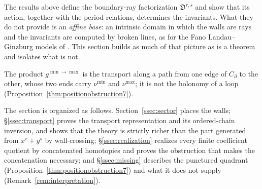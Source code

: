 \documentclass[11pt]{amsart}
\theoremstyle{definition}
\theoremstyle{remark}
\newcommand{\Dscr}{\mathfrak{D}}
\begin{document}
The results above define the boundary-ray factorization
$\Dscr^{r,s}$ and show that its action, together with the period relations,
determines the invariants. What they do not provide is an
\emph{affine base}: an intrinsic domain in which the walls are rays and the
invariants are computed by broken lines, as for the Fano Landau--Ginzburg models
of \cite{Gross10,CPS}. This section builds as much of that picture as is a theorem
and isolates what is not.

The product $g^{\min\to\max}$ is the transport
along a path from one edge of $C_\partial$ to the other, whose two ends carry
$\nu^{\min}$ and $\nu^{\max}$; it is not the holonomy of a loop
(Proposition~\ref{thm:positionobstruction7}).

The section is organized as follows.  Section~\ref{ssec:sector} places the
walls; \S\ref{ssec:transport} proves the transport representation and its
ordered-chain inversion, and shows that the theory is strictly richer than the
part generated from $x^r+y^s$ by wall-crossing; \S\ref{ssec:realization} realizes every finite coefficient
quotient by concatenated homotopies and proves the obstruction that makes the
concatenation necessary; and \S\ref{ssec:missing} describes the punctured
quadrant (Proposition~\ref{thm:positionobstruction7}) and what it does not
supply (Remark~\ref{rem:interpretation}).
\end{document}
